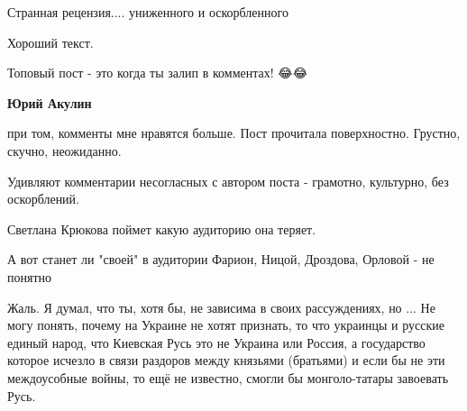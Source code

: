 \begin{itemize}
Странная рецензия.... униженного и оскорбленного

 

Хороший текст.

 
Топовый пост - это когда ты залип в комментах! 😂😂

\begin{itemize}
 
\textbf{Юрий Акулин} 

при том, комменты мне нравятся больше. Пост прочитала поверхностно. Грустно,
скучно, неожиданно.

Удивляют комментарии несогласных с автором поста - грамотно, культурно, без
оскорблений.

Светлана Крюкова поймет какую аудиторию она теряет.

А вот станет ли "своей" в аудитории Фарион, Ницой, Дроздова, Орловой - не
понятно
\end{itemize}

 
Жаль. Я думал, что ты, хотя бы, не зависима в своих рассуждениях, но ... Не могу понять, почему на Украине не хотят признать, то что украинцы и русские единый народ, что Киевская Русь это не Украина или Россия, а государство которое исчезло в связи раздоров между князьями (братьями) и если бы не эти междоусобные войны, то ещё не известно, смогли бы монголо-татары завоевать Русь.

 

\end{itemize}
